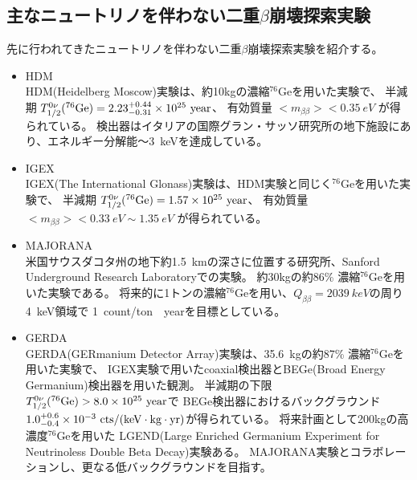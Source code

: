 \documentclass[a4paper,10pt]{jreport}
\begin{document}
\subsection{主なニュートリノを伴わない二重$\beta$崩壊探索実験}

先に行われてきたニュートリノを伴わない二重$\beta$崩壊探索実験を紹介する。

\begin{itemize}

	\item HDM \\
	HDM(Heidelberg Moscow)実験は、約10kgの濃縮$^{76}$Geを用いた実験で、
	半減期 $T_{1/2}^{0\nu}(^{76}\rm{Ge}) = 2.23 ^{+0.44} _{-0.31} \times 10^{25} \ \rm{year}$、
	有効質量 $< m_{\beta\beta} > < \SI{0.35}{eV}$
	が得られている。
	検出器はイタリアの国際グラン・サッソ研究所の地下施設にあり、エネルギー分解能〜\SI{3}{keV}を達成している。
	\cite{HDM}
	
	\item IGEX \\
	IGEX(The International Glonass)実験は、HDM実験と同じく$^{76}$Geを用いた実験で、
	半減期 $T_{1/2}^{0\nu}(^{76}\rm{Ge}) = 1.57 \times 10^{25} \ \rm{year}$、
	有効質量 $< m_{\beta\beta} > < \SI{0.33}{eV} \sim \SI{1.35}{eV}$
	が得られている。
	
	\item MAJORANA \\
	米国サウスダコタ州の地下約\SI{1.5}{km}の深さに位置する研究所、Sanford Underground Research Laboratoryでの実験。
	約30kgの約86\% 濃縮$^{76}$Geを用いた実験である。
	将来的に1トンの濃縮$^{76}$Geを用い、$Q_{\beta\beta}=\SI{2039}{keV}$の周り\SI{4}{keV}領域で
	\SI{1}{count/ton \cdot year}を目標としている。
	\cite{MAJORANA}
	
	\item GERDA \\
	GERDA(GERmanium Detector Array)実験は、\SI{35.6}{kg}の約87\% 濃縮$^{76}$Geを用いた実験で、
	IGEX実験で用いたcoaxial検出器とBEGe(Broad Energy Germanium)検出器を用いた観測。
	半減期の下限 $T_{1/2}^{0\nu}(^{76}\rm{Ge}) > 8.0 \times 10^{25} \ \rm{year}$で
	BEGe検出器におけるバックグラウンド$1.0 ^{+0.6} _{-0.4} \times 10^{-3} \ \rm{cts/(keV \cdot kg \cdot yr)}$が得られている。
	将来計画として200kgの高濃度$^{76}$Geを用いた
	LGEND(Large Enriched Germanium Experiment for Neutrinoless Double Beta Decay)実験ある。
	MAJORANA実験とコラボレーションし、更なる低バックグラウンドを目指す。
	\cite{GERDA}
	

\end{itemize}
\end{document}
